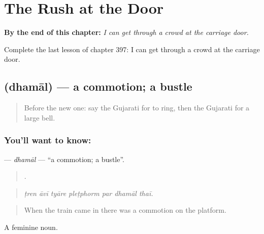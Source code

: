 
\chapter{The Rush at the Door}
\label{ch:gu-the-rush-at-the-door}

\begin{chapteropening}
\textbf{By the end of this chapter:} \emph{I can get through a crowd at the carriage door.}

Complete the last lesson of chapter 397: I can get through a crowd at the carriage door.
\end{chapteropening}

\section[\texorpdfstring{\gu{ધમાલ} (dhamāl)}{ધમાલ (dhamāl)}]{ (dhamāl) — a commotion; a bustle}

\label{lesson:GU-C397-dhamal}



\begin{quote}
Before the new one: say the Gujarati for to ring, then the Gujarati for a large bell.
\end{quote}

\subsection*{You'll want to know: }
\textbf{} — \emph{dhamāl} — \textquotedblleft{}a commotion; a bustle\textquotedblright{}.

\begin{quote}
      .
\end{quote}

\begin{quote}
\emph{ṭren āvī tyāre pleṭphorm par dhamāl thaī.}
\end{quote}

\begin{quote}
When the train came in there was a commotion on the platform.
\end{quote}

A feminine noun.

